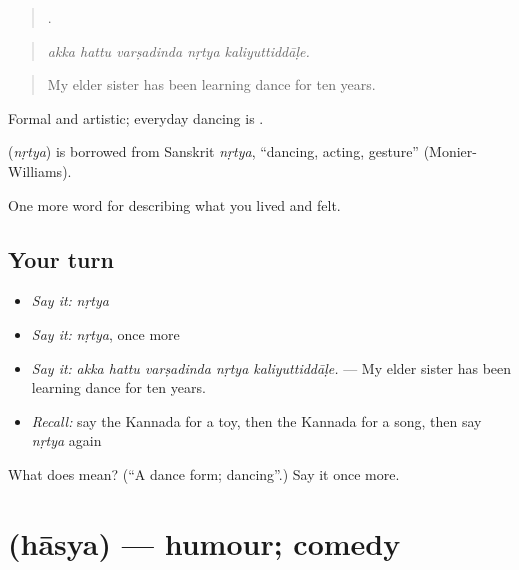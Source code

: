 \begin{quote}
    .
\end{quote}

\begin{quote}
\emph{akka hattu varṣadinda nṛtya kaliyuttiddāḷe.}
\end{quote}

\begin{quote}
My elder sister has been learning dance for ten years.
\end{quote}

Formal and artistic; everyday dancing is .

\begin{cousinweb}
\textbf{} (\emph{nṛtya}) is borrowed from Sanskrit \emph{nṛtya}, \textquotedblleft{}dancing, acting, gesture\textquotedblright{} (Monier-Williams).
\end{cousinweb}

\begin{grammarlens}[title={What you've built}]
One more word for describing what you lived and felt.
\end{grammarlens}

\subsection*{Your turn}
\begin{itemize}
\raggedright
  \item \emph{Say it:} \emph{nṛtya}
  \item \emph{Say it:} \emph{nṛtya}, once more
  \item \emph{Say it:} \emph{akka hattu varṣadinda nṛtya kaliyuttiddāḷe.} — My elder sister has been learning dance for ten years.
  \item \emph{Recall:} say the Kannada for a toy, then the Kannada for a song, then say \emph{nṛtya} again
\end{itemize}

\begin{tcolorbox}[breakable,colback=teal!4,colframe=teal!35!black,title={Before you move on}]
What does  mean? (\textquotedblleft{}A dance form; dancing\textquotedblright{}.) Say it once more.
\end{tcolorbox}
\section[\texorpdfstring{\kn{ಹಾಸ್ಯ} (hāsya)}{ಹಾಸ್ಯ (hāsya)}]{ (hāsya) — humour; comedy}

